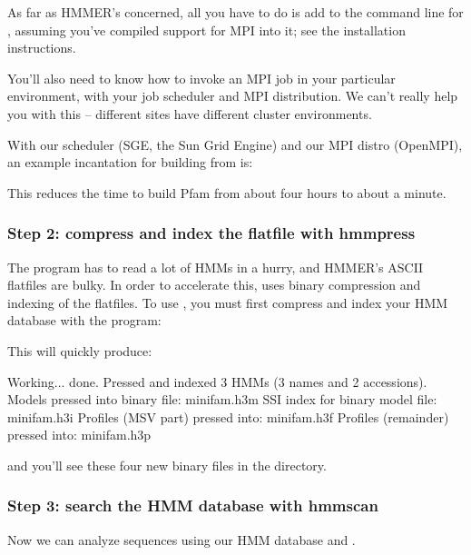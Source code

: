 As far as HMMER's concerned, all you have to do is add  to
the command line for , assuming you've compiled support
for MPI into it; see the installation instructions.

You'll also need to know how to invoke an MPI job in your particular
environment, with your job scheduler and MPI distribution. We can't
really help you with this -- different sites have different cluster
environments.

With our scheduler (SGE, the Sun Grid Engine) and our MPI distro
(OpenMPI), an example incantation for building  from
 is:


This reduces the time to build Pfam from about four hours to about a
minute.

\subsubsection{Step 2: compress and index the flatfile with hmmpress}

The  program has to read a lot of HMMs in a hurry, and
HMMER's ASCII flatfiles are bulky. In order to accelerate this,
 uses binary compression and indexing of the flatfiles.
To use , you must first compress and index your HMM
database with the  program:


This will quickly produce:

\begin{sreoutput}
Working...    done.
Pressed and indexed 3 HMMs (3 names and 2 accessions).
Models pressed into binary file:   minifam.h3m
SSI index for binary model file:   minifam.h3i
Profiles (MSV part) pressed into:  minifam.h3f
Profiles (remainder) pressed into: minifam.h3p
\end{sreoutput}

and you'll see these four new binary files in the directory.

\subsubsection{Step 3: search the HMM database with hmmscan}

Now we can analyze sequences using our HMM database and
. 


